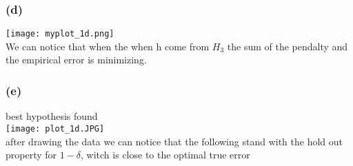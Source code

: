 \documentclass[12pt]{article}
\theoremstyle{plain}
\begin{document}
\subsubsection*{(d)}
\texttt{[image: myplot\_1d.png]}\\
We can notice that when the when h come from $H_3$ the sum of the pendalty and the empirical error is minimizing.
\subsubsection*{(e)}
best hypothesis found\\
\texttt{[image: plot\_1d.JPG]}\\
after drawing the data we can notice that the following stand with the hold out property for $1-\delta$, witch is close to the optimal true error
\end{document}
